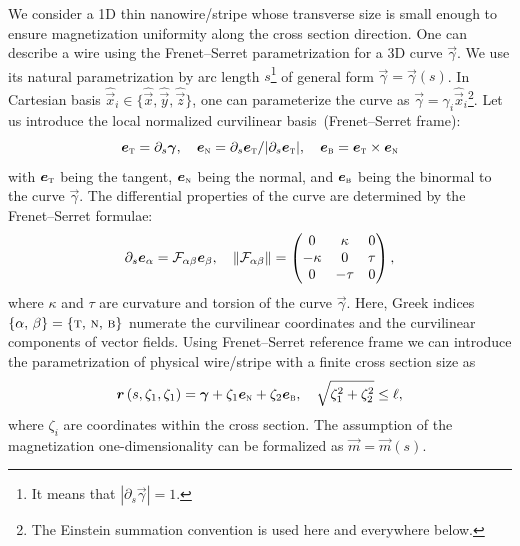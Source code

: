 \documentclass[runningheads]{llncs}
\begin{document}
We consider a 1D thin nanowire/stripe whose transverse size is small enough to ensure magnetization uniformity along the cross section direction. One can describe a wire using the Frenet--Serret parametrization for a 3D curve $\vec{\gamma}$. We use its natural parametrization by arc length $s$\footnote{It means that $|\partial_s\vec{\gamma}|=1$.} of general form $\vec{\gamma}=\vec{\gamma}(s)$. In Cartesian basis $\hat{\vec{x}}_i\in\{\hat{\vec{x}},\hat{\vec{y}},\hat{\vec{z}}\}$, one can parameterize the curve as $\vec{\gamma}=\gamma_i\hat{\vec{x}}_i$\footnote{The Einstein summation convention is used here and everywhere below.}. Let
us introduce the local normalized curvilinear basis~(Frenet--Serret frame):
\begin{equation}\label{eq:FrenetSerret_basis}
	\vec{e}_\textsc{t}=\partial_s \vec{\gamma},\quad \vec{e}_\textsc{n}=\partial_s\vec{e}_\textsc{t}/|\partial_s\vec{e}_\textsc{t}|,\quad \vec{e}_\textsc{b}=\vec{e}_\textsc{t}\times\vec{e}_\textsc{n}
\end{equation}
with $\vec{e}_\textsc{t}$ being the tangent, $\vec{e}_\textsc{n}$ being the normal, and $\vec{e}_\textsc{b}$ being the binormal to the curve $\vec{\gamma}$. The differential properties of the curve are determined by the Frenet--Serret formulae:
\begin{equation}\notag%
	\partial_s\vec{e}_\alpha = \mathcal{F}_{\alpha\beta}\vec{e}_\beta,\quad \|\mathcal{F}_{\alpha\beta}\|=\left(
		\begin{matrix}
			0&\kappa&0\\
			-\kappa&0&\tau\\
			0&-\tau&0
		\end{matrix}\right),
\end{equation}
where $\kappa$ and $\tau$ are curvature and torsion of the curve $\vec{\gamma}$. Here, Greek indices $\{\alpha,\, \beta\} = \{\textsc{t},\, \textsc{n},\, \textsc{b}\}$ numerate the curvilinear coordinates and the curvilinear components of vector fields.
Using Frenet--Serret reference frame we can introduce the parametrization of physical wire/stripe with a finite cross section size as
\begin{equation}\notag
\vec{r}\left(s,\zeta_1,\zeta_1\right)=\vec{\gamma}+\zeta_1\vec{e}_\textsc{n}+\zeta_2\vec{e}_\textsc{b},\quad \sqrt{\zeta_1^2+\zeta_2^2}\leq \ell,
\end{equation}
where $\zeta_i$ are coordinates within the cross section. The assumption of the magnetization one-dimensionality can be formalized as $\vec{m}=\vec{m}(s)$.
\end{document}
